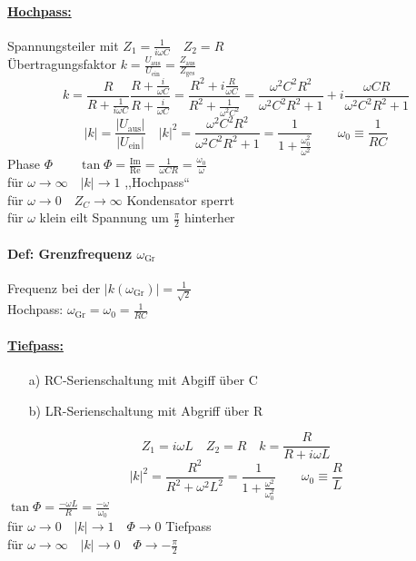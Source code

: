 \documentclass[titlepage,12pt,a4paper,ngerman]{report}
\newcommand{\tx}[1]{\textrm{#1}}
\begin{document}
\paragraph{\underline{Hochpass:}}
Spannungsteiler mit $ Z_1 = \frac{1}{i \omega C} \quad Z_2 = R $\\
Übertragungsfaktor $ k = \frac{U_{\tx{aus}}}{U_{\tx{ein}}} = \frac{Z_{\tx{aus}}}{Z_{\tx{ges}}} $
$$ k = \frac{R}{R + \frac{1}{i \omega C}} \frac{R + \frac{i}{\omega C}}{R + \frac{i}{\omega C}} = \frac{R^2 + i \frac{R}{\omega C}}{ R^2 + \frac{1}{\omega^2 C^2}} = \frac{\omega^2 C^2 R^2}{\omega^2 C^2 R^2 + 1} + i \frac{\omega C R}{\omega^2 C^2 R^2 + 1} $$
$$ |k| = \frac{|U_{\tx{aus}} |}{| U_{\tx{ein}} |} \quad |k|^2 = \frac{\omega ^2 C^2 R^2}{\omega^2 C^2 R^2 + 1} = \frac{1}{1+ \frac{\omega_0^2}{\omega^2}} \qquad \omega_0 \equiv \frac{1}{RC} $$
Phase $ \Phi \qquad \tan \Phi = \frac{\tx{Im}}{\tx{Re}} = \frac{1}{\omega C R} = \frac{\omega_0}{\omega} $\\
für $ \omega \rightarrow \infty \quad |k| \rightarrow 1 $ ,,Hochpass``\\
für $ \omega \rightarrow 0 \quad Z_C \rightarrow\infty $ Kondensator sperrt\\
für $ \omega $ klein eilt Spannung um $ \frac{\pi}{2} $ hinterher
\paragraph{Def: Grenzfrequenz $ \omega_{\tx{Gr}} $}
Frequenz bei der $ |k(\omega_{\tx{Gr}})| = \frac{1}{\sqrt{2}} $\\
Hochpass: $ \omega_{\tx{Gr}} = \omega_0 = \frac{1}{RC} $
\paragraph{\underline{Tiefpass:}}
\begin{itemize}
	\item[a)] RC-Serienschaltung mit Abgiff über C
	\item[b)] LR-Serienschaltung mit Abgriff über R
\end{itemize}
$$ Z_1 = i \omega L \quad Z_2 = R \quad k = \frac{R}{R+i \omega L} $$
$$ |k|^2 = \frac{R^2}{R^2 + \omega^2 L^2} = \frac{1}{1 + \frac{\omega^2}{\omega_0^2}} \qquad \omega_0 \equiv \frac{R}{L} $$
$ \tan \Phi = \frac{-\omega L}{R} = \frac{-\omega}{\omega_0} $\\
für $ \omega\rightarrow 0 \quad |k| \rightarrow 1 \quad \Phi \rightarrow 0 $ Tiefpass\\
für $ \omega \rightarrow \infty \quad |k| \rightarrow 0 \quad \Phi \rightarrow -\frac{\pi}{2} $\\
\end{document}
